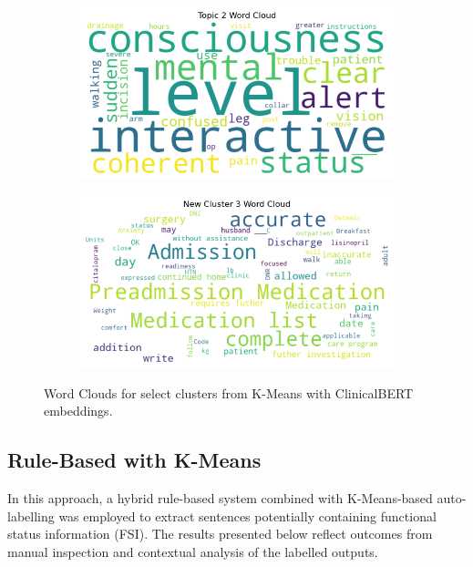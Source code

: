 \begin{figure}[H]
\centering
\begin{subfigure}{0.45\textwidth}
  \centering
  \includegraphics[width=\linewidth]{images/Unsupervised_Results/wordcloud_cluster_1.png}
\end{subfigure}
\hfill
\begin{subfigure}{0.45\textwidth}
  \centering
  \includegraphics[width=\linewidth]{images/Unsupervised_Results/wordcloud_cluster_3.png}
\end{subfigure}
\caption{Word Clouds for select clusters from K-Means with ClinicalBERT embeddings.}
\label{fig:lda-kmeans-wordclouds-1-3}
\end{figure}

\subsection{Rule-Based with K-Means}

In this approach, a hybrid rule-based system combined with K-Means-based auto-labelling was employed to extract sentences potentially containing functional status information (FSI). The results presented below reflect outcomes from manual inspection and contextual analysis of the labelled outputs.

